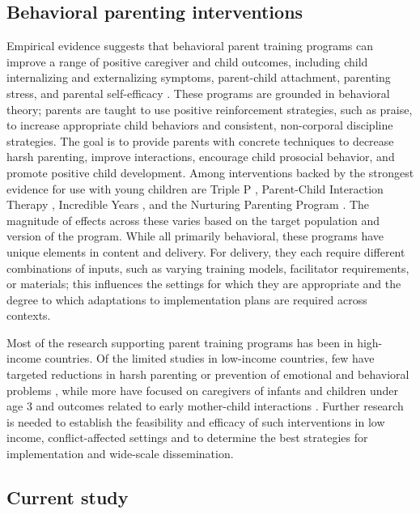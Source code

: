 \documentclass[12pt,authoryear]{elsarticle}\usepackage{knitr}
\begin{document}
\subsection*{Behavioral parenting interventions}

Empirical evidence suggests that behavioral parent training programs can improve a range of positive caregiver and child outcomes, including child internalizing and externalizing symptoms, parent-child attachment, parenting stress, and parental self-efficacy \citep{Chase:2008,Eisenstadt:1993,Eyberg:2008}. These programs are grounded in behavioral theory; parents are taught to use positive reinforcement strategies, such as praise, to increase appropriate child behaviors and consistent, non-corporal discipline strategies. The goal is to provide parents with concrete techniques to decrease harsh parenting, improve interactions, encourage child prosocial behavior, and promote positive child development. Among interventions backed by the strongest evidence for use with young children are Triple P \citep{Nowak:2008}, Parent-Child Interaction Therapy \citep{Eisenstadt:1993}, Incredible Years \citep{Webster-Stratton:2011}, and the Nurturing Parenting Program \citep{Maher:2011}. The magnitude of effects across these varies based on the target population and version of the program. While all primarily behavioral, these programs have unique elements in content and delivery. For delivery, they each require different combinations of inputs, such as varying training models, facilitator requirements, or materials; this influences the settings for which they are appropriate and the degree to which adaptations to implementation plans are required across contexts. 

Most of the research supporting parent training programs has been in high-income countries. Of the limited studies in low-income countries, few have targeted reductions in harsh parenting or prevention of emotional and behavioral problems \citep{Jin:2007,Klein:2004,Oveisi:2010,Mejia:2012}, while more have focused on caregivers of infants and children under age 3 and outcomes related to early mother-child interactions \citep{Knerr:2013}. Further research is needed to establish the feasibility and efficacy of such interventions in low income, conflict-affected settings and to determine the best strategies for implementation and wide-scale dissemination. 

\subsection*{Current study}
\end{document}
